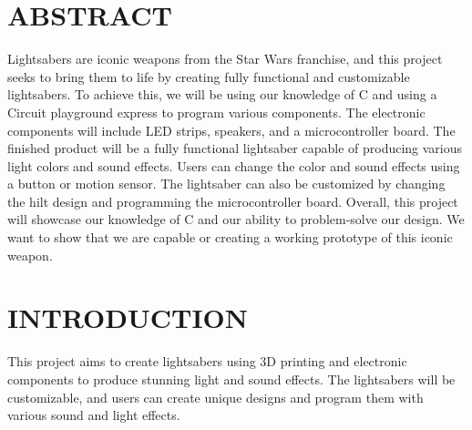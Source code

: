 \documentclass[12pt]{article}
\begin{document}
\tableofcontents
\pagebreak

\section{ABSTRACT}
Lightsabers are iconic weapons from the Star Wars franchise, and this project seeks to bring them to life by creating fully functional and customizable lightsabers. To achieve this, we will be using our knowledge of C and using a Circuit playground express to program various components.  The electronic components will include LED strips, speakers, and a microcontroller board.
The finished product will be a fully functional lightsaber capable of producing various light colors and sound effects. Users can change the color and sound effects using a button or motion sensor. The lightsaber can also be customized by changing the hilt design and programming the microcontroller board.
Overall, this project will showcase our knowledge of C and our ability to problem-solve our design. We want to show that we are capable or creating a working prototype of this iconic weapon. 
\section{INTRODUCTION}
This project aims to create lightsabers using 3D printing and electronic components to produce stunning light and sound effects. The lightsabers will be customizable, and users can create unique designs and program them with various sound and light effects.
\end{document}
